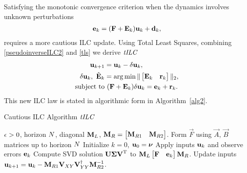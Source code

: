 Satisfying the monotonic convergence criterion when the dynamics involves unknown perturbations 
%
\begin{equation}
\begin{aligned}
\boldsymbol{\mathrm{e}}_k = (\boldsymbol{\mathrm{F}} + \boldsymbol{\mathrm{E}}_k)\boldsymbol{\mathrm{u}}_k + \boldsymbol{\mathrm{d}}_k,
\end{aligned}
\label{exactModel}
\end{equation}
%
\noindent requires a more cautious ILC update. Using Total Least Squares, combining \eqref{pseudoinverseILC2} and \eqref{tls} we derive $\emph{tILC}$
%
\begin{align}
\boldsymbol{\mathrm{u}}_{k+1} &= \boldsymbol{\mathrm{u}}_{k} - \delta \boldsymbol{\mathrm{u}}_{k}, \label{tlsilc1} \\ 
\delta \boldsymbol{\mathrm{u}}_{k}, \ \hat{\boldsymbol{\mathrm{E}}}_k &= \arg\min \|\begin{bmatrix}\boldsymbol{\mathrm{E}}_k & \boldsymbol{\mathrm{r}}_k \end{bmatrix} \|_{2}, \label{tlsilc2} \\
\text{subject to} &\ (\boldsymbol{\mathrm{F}} + \boldsymbol{\mathrm{E}}_k)\delta \boldsymbol{\mathrm{u}}_k = \boldsymbol{\mathrm{e}}_k + \boldsymbol{\mathrm{r}}_k \label{tlsilc3}.
\end{align}
%
\noindent This new ILC law is stated in algorithmic form in Algorithm~\ref{alg2}.
%
\begin{algorithm}[tb]
   \caption{Cautious ILC Algorithm $\emph{tILC}$}
   \label{alg2}
\begin{algorithmic}
    $\epsilon > 0$, horizon $N$, diagonal $\boldsymbol{\mathrm{M}}_{L}$, $\boldsymbol{\mathrm{M}}_{R} = \begin{bmatrix} \boldsymbol{\mathrm{M}}_{R1} & \boldsymbol{\mathrm{M}}_{R2}\end{bmatrix}$.
   \STATE Form $\vec{F}$ using $\vec{A}$, $\vec{B}$ matrices up to horizon $N$
   \STATE Initialize $k = 0$, $\boldsymbol{\mathrm{u}}_0 = \boldsymbol{\mathrm{\nu}}$
   \REPEAT 
   	   \STATE Apply inputs $\boldsymbol{\mathrm{u}}_{k}$ and observe errors $\boldsymbol{\mathrm{e}}_{k}$
	   \STATE Compute SVD solution $\boldsymbol{\mathrm{U}} \boldsymbol{\mathrm{\Sigma}} \boldsymbol{\mathrm{V}}^{\mathrm{T}}$ to $\boldsymbol{\mathrm{M}}_{L}\begin{bmatrix} \boldsymbol{\mathrm{F}} & \boldsymbol{\mathrm{e}}_k \end{bmatrix}\boldsymbol{\mathrm{M}}_{R}$.
	   \STATE Update inputs $\boldsymbol{\mathrm{u}}_{k+1} = \boldsymbol{\mathrm{u}}_{k} - \boldsymbol{\mathrm{M}}_{R1}\boldsymbol{\mathrm{V}}_{XY}\boldsymbol{\mathrm{V}}_{YY}^{\dagger}\boldsymbol{\mathrm{M}}_{R2}^{-1}$.
\end{algorithmic}
\end{algorithm}
%